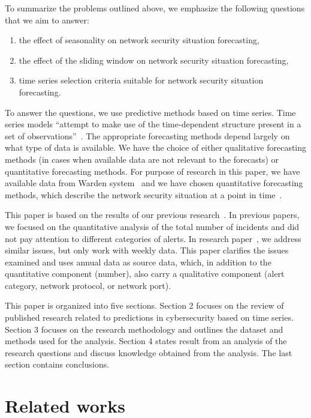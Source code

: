 \documentclass[runningheads]{llncs}
\begin{document}
To summarize the problems outlined above, we emphasize the following questions that we aim to answer:
\begin {enumerate}
 \item the effect of seasonality on network security situation forecasting,
 \item the effect of the sliding window on network security situation forecasting,
 \item time series selection criteria suitable for network security situation forecasting.
\end{enumerate}

To answer the questions, we use predictive methods based on time series. Time series models “attempt to make use of the time-dependent structure present in a set of observations”~\cite{condon2008analysis}. The appropriate forecasting methods depend largely on what type of data is available. We have the choice of either qualitative forecasting methods (in cases when available data are not relevant to the forecasts) or quantitative forecasting methods. For purpose of research in this paper, we have available data from Warden system~\cite{kacha2015warden} and we have chosen quantitative forecasting methods, which describe the network security situation at a point in time~\cite{Leau2015}.

This paper is based on the results of our previous research~\cite{Sokol2018}. In previous papers, we focused on the quantitative analysis of the total number of incidents and did not pay attention to different categories of alerts. In research paper~\cite{new_paper}, we address similar issues, but only work with weekly data. This paper clarifies the issues examined and uses annual data as source data, which, in addition to the quantitative component (number), also carry a qualitative component (alert category, network protocol, or network port).

This paper is organized into five sections. Section 2 focuses on  the review of published research related to predictions in cybersecurity based on time series. Section 3 focuses on the research methodology and outlines the dataset and methods used for the analysis. Section 4 states result from an analysis of the research questions and discuss knowledge obtained from the analysis. The last section contains conclusions.

\section{Related works}
\end{document}
